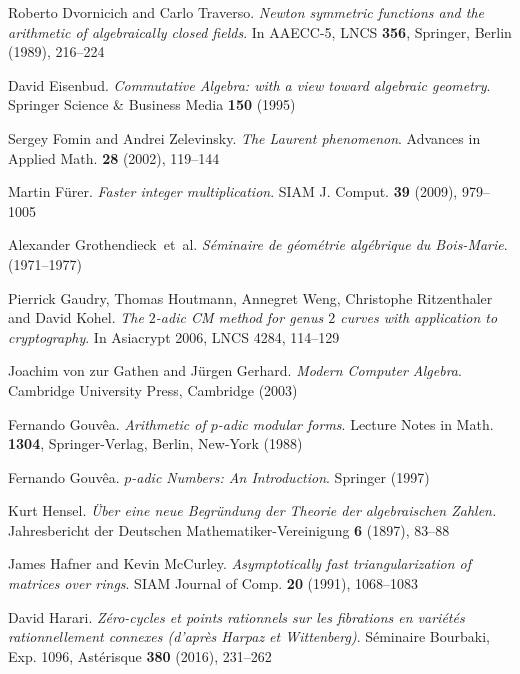 \documentclass[11pt]{article}
\numberwithin{equation}{section}
\numberwithin{figure}{section}
\theoremstyle{definition}
\begin{document}
\begin{thebibliography}{99}
  Roberto Dvornicich and Carlo Traverso. 
  \emph{Newton symmetric functions and the arithmetic of algebraically closed fields}. 
  In AAECC-5, LNCS \textbf{356}, Springer, Berlin (1989), 216--224

  David Eisenbud.
  \emph{Commutative Algebra: with a view toward algebraic geometry}.
  Springer Science \& Business Media \textbf{150} (1995)

  Sergey Fomin and Andrei Zelevinsky.
  \emph{The Laurent phenomenon}.
  {Advances in Applied Math.} \textbf{28} (2002), 119--144

  Martin Fürer. 
  \emph{Faster integer multiplication}.
  SIAM J. Comput. \textbf{39} (2009), 979--1005

  Alexander Grothendieck~et~al.
  \emph{Séminaire de géométrie algébrique du Bois-Marie}.
  (1971--1977)

  Pierrick Gaudry, Thomas Houtmann, Annegret Weng, Christophe Ritzenthaler and David Kohel.
  \emph{The $2$-adic CM method for genus $2$ curves with application to cryptography}.
  In {Asiacrypt 2006}, {LNCS 4284}, 114--129

  Joachim von zur Gathen and Jürgen Gerhard.
  \emph{Modern Computer Algebra}.
  Cambridge University Press, Cambridge (2003)


  Fernando Gouvêa.
  \emph{Arithmetic of $p$-adic modular forms}.
  Lecture Notes in Math. \textbf{1304}, Springer-Verlag, Berlin, New-York (1988)

  Fernando Gouvêa.
  \emph{$p$-adic Numbers: An Introduction}.
  Springer (1997)

  Kurt Hensel. 
  \emph{Über eine neue Begründung der Theorie der algebraischen Zahlen.}
  Jahresbericht der Deutschen Mathematiker-Vereinigung \textbf{6} (1897), 83--88

  James Hafner and Kevin McCurley.
  \emph{Asymptotically fast triangularization of matrices over rings}. 
  SIAM Journal of Comp. \textbf{20} (1991), 1068--1083

  David Harari.
  \emph{Zéro-cycles et points rationnels sur les fibrations en 
  variétés rationnellement connexes (d'après Harpaz et Wittenberg)}.
  Séminaire Bourbaki, Exp. 1096, Astérisque \textbf{380} (2016), 231--262


\end{thebibliography}
\end{document}
